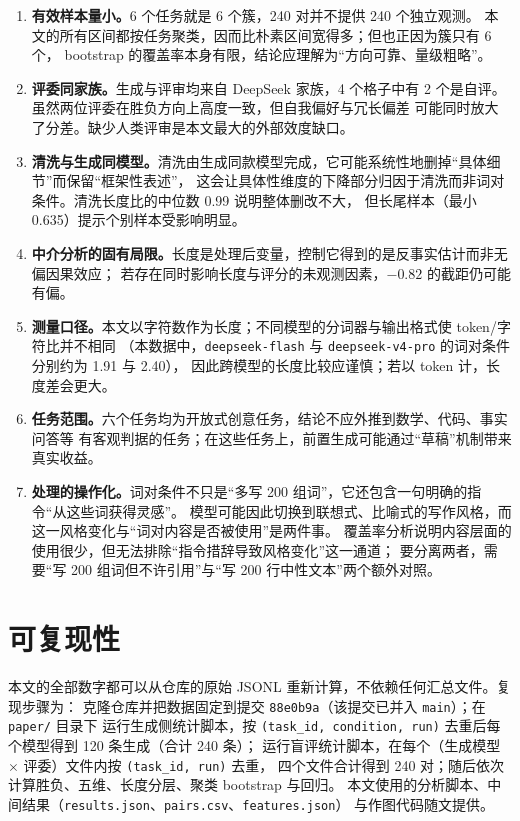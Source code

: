 \documentclass[UTF8,11pt,a4paper]{ctexart}
\newcommand{\deepflash}{\texttt{deepseek-flash}}
\newcommand{\deeppro}{\texttt{deepseek-v4-pro}}
\begin{document}
\begin{enumerate}[label=(\arabic*)]
\item \textbf{有效样本量小。}6 个任务就是 6 个簇，240 对并不提供 240 个独立观测。
      本文的所有区间都按任务聚类，因而比朴素区间宽得多；但也正因为簇只有 6 个，
      bootstrap 的覆盖率本身有限，结论应理解为“方向可靠、量级粗略”。
\item \textbf{评委同家族。}生成与评审均来自 DeepSeek 家族，4 个格子中有 2 个是自评。
      虽然两位评委在胜负方向上高度一致，但自我偏好\cite{panickssery2024}与冗长偏差\cite{saito2023}
      可能同时放大了分差。缺少人类评审是本文最大的外部效度缺口。
\item \textbf{清洗与生成同模型。}清洗由生成同款模型完成，它可能系统性地删掉“具体细节”而保留“框架性表述”，
      这会让具体性维度的下降部分归因于清洗而非词对条件。清洗长度比的中位数 0.99 说明整体删改不大，
      但长尾样本（最小 0.635）提示个别样本受影响明显。
\item \textbf{中介分析的固有局限。}长度是处理后变量，控制它得到的是反事实估计而非无偏因果效应；
      若存在同时影响长度与评分的未观测因素，$-0.82$ 的截距仍可能有偏。
\item \textbf{测量口径。}本文以字符数作为长度；不同模型的分词器与输出格式使 token/字符比并不相同
      （本数据中，\deepflash{} 与 \deeppro{} 的词对条件分别约为 1.91 与 2.40），
      因此跨模型的长度比较应谨慎；若以 token 计，长度差会更大。
\item \textbf{任务范围。}六个任务均为开放式创意任务，结论不应外推到数学、代码、事实问答等
      有客观判据的任务；在这些任务上，前置生成可能通过“草稿”机制带来真实收益。
\item \textbf{处理的操作化。}词对条件不只是“多写 200 组词”，它还包含一句明确的指令“从这些词获得灵感”。
      模型可能因此切换到联想式、比喻式的写作风格，而这一风格变化与“词对内容是否被使用”是两件事。
      覆盖率分析说明内容层面的使用很少，但无法排除“指令措辞导致风格变化”这一通道；
      要分离两者，需要“写 200 组词但不许引用”与“写 200 行中性文本”两个额外对照。
\end{enumerate}

\section{可复现性}

本文的全部数字都可以从仓库的原始 JSONL 重新计算，不依赖任何汇总文件。复现步骤为：
克隆仓库并把数据固定到提交 \texttt{88e0b9a}（该提交已并入 \texttt{main}）；在 \texttt{paper/} 目录下
运行生成侧统计脚本，按 \texttt{(task\_id, condition, run)} 去重后每个模型得到 120 条生成（合计 240 条）；
运行盲评统计脚本，在每个（生成模型 $\times$ 评委）文件内按 \texttt{(task\_id, run)} 去重，
四个文件合计得到 240 对；随后依次计算胜负、五维、长度分层、聚类 bootstrap 与回归。
本文使用的分析脚本、中间结果（\texttt{results.json}、\texttt{pairs.csv}、\texttt{features.json}）
与作图代码随文提供。
\end{document}
